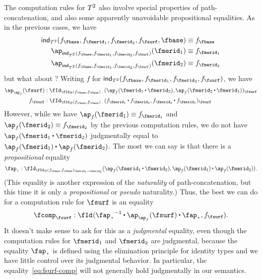 \documentclass{amsart}
\begin{document}
The computation rules for $T^2$ also involve special properties of path-concatenation, and also some apparently unavoidable propositional equalities.
As in the previous cases, we have
\begin{align}
  \ind{\torustype}(f_\fbase,f_{\fmerid_1},f_{\fmerid_2},f_\fsurf,\fbase) &\jdeq f_\fbase\\
  \ap_{\ind{\torustype}(f_\fbase,f_{\fmerid_1},f_{\fmerid_2},f_\fsurf)}(\fmerid_1) &\jdeq f_{\fmerid_1}\\
  \ap_{\ind{\torustype}(f_\fbase,f_{\fmerid_1},f_{\fmerid_2},f_\fsurf)}(\fmerid_2) &\jdeq f_{\fmerid_2}
\end{align}
but what about \fsurf?
Writing $f$ for $\ind{\torustype}(f_\fbase,f_{\fmerid_1},f_{\fmerid_2},f_\fsurf)$, we have
\begin{align}
  \ap_{\ap_{f}}(\fsurf)
  &: \idover[{\idover[B]{f_\fbase}{f_\fbase}{\blank}}]{\ap_{f}(\fmerid_1 \ct \fmerid_2)}{\ap_{f}(\fmerid_2 \ct \fmerid_1)}{\fsurf}\\
  f_\fsurf &: \idover[{\idover[B]{f_\fbase}{f_\fbase}{\blank}}]{f_{\fmerid_1} \ct f_{\fmerid_2}}{f_{\fmerid_2} \ct f_{\fmerid_1}}{\fsurf}
\end{align}
However, while we have $\ap_{f} (\fmerid_1) \jdeq f_{\fmerid_1}$ and $\ap_{f} (\fmerid_2) \jdeq f_{\fmerid_2}$ by the previous computation rules, we do not have ${\ap_{f}(\fmerid_1 \ct \fmerid_2)}$ judgmentally equal to $\ap_{f} (\fmerid_1) \ct \ap_{f} (\fmerid_2)$.
The most we can say is that there is a \emph{propositional} equality
\[ \fap_{\ct} : \id[{\idover[B]{f_\fbase}{f_\fbase}{\fmerid_1 \ct \fmerid_2}}]{\ap_{f}(\fmerid_1 \ct \fmerid_2)}{\ap_{f} (\fmerid_1) \ct \ap_{f} (\fmerid_2)}. \]
(This equality is another expression of the \emph{naturality} of path-concatenation, but this time it is only a \emph{propositional} or \emph{pseudo} naturality.)
Thus, the best we can do for a computation rule for $\fsurf$ is an equality
\begin{equation}
  \fcomp_{\fsurf}: \id{\opp{\fap_{\ct}} \ct \ap_{\ap_{f}}(\fsurf) \ct \fap_{\ct}}
  {f_\fsurf}.\label{eq:fsurf-comp}
\end{equation}
It doesn't make sense to ask for this as a \emph{judgmental} equality, even though the computation rules for $\fmerid_1$ and $\fmerid_2$ are judgmental, because the equality $\fap_{\ct}$ is defined using the elimination principle for identity types and we have little control over its judgmental behavior.
In particular, the equality~\eqref{eq:fsurf-comp} will not generally hold judgmentally in our semantics.
\end{document}
